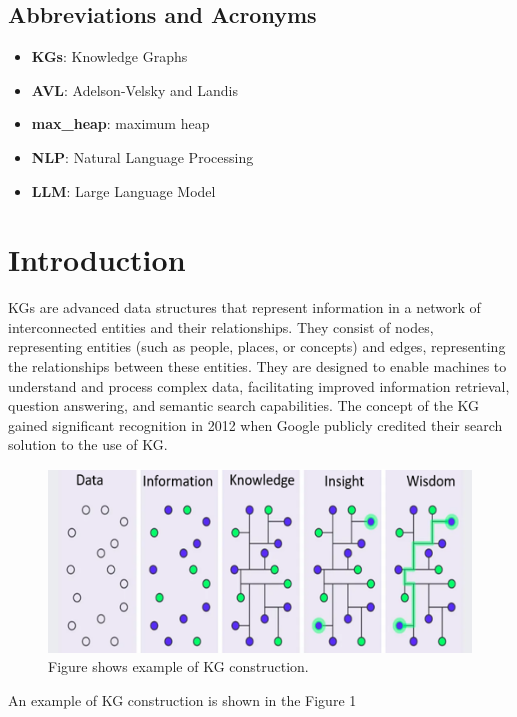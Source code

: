 \documentclass[conference]{IEEEtran}
\begin{document}
\subsection{Abbreviations and Acronyms}\label{AA}

\begin{itemize}
    \item \textbf{KGs}: Knowledge Graphs
    \item \textbf{AVL}: Adelson-Velsky and Landis
    \item \textbf{max\_heap}: maximum heap
    \item \textbf{NLP}: Natural Language Processing
    \item \textbf{LLM}: Large Language Model
\end{itemize}


\section{Introduction}
KGs are advanced data structures that represent information in a network of interconnected entities and their relationships. They consist of nodes, representing entities (such as people, places, or concepts) and edges, representing the relationships between these entities. They are designed to enable machines to understand and process complex data, facilitating improved information retrieval, question answering, and semantic search capabilities.
The concept of the KG gained significant recognition in 2012 when Google \cite{b7} publicly credited their search solution to the use of KG.


\begin{figure}[htbp]
\centering
\includegraphics[width=0.8\linewidth]{intro_dots_image_kg.png}
\caption{Figure shows example of KG construction.}
\label{fig}
\end{figure}

An example of KG construction is shown in the Figure 1
\end{document}
